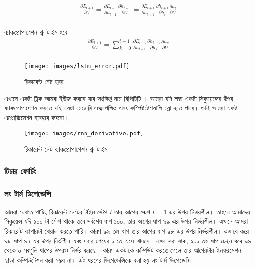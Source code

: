 \documentclass{article}[book]
\begin{document}
\begin{align} %
   \frac {\partial E_{t+1}} {\partial U} = \frac {\partial E_{t+1}} { \partial h_{t+1}} \frac {\partial h_{t+1}} { \partial U} = \frac {\partial E_{t+1}} { \partial h_{t+1}} \frac {\partial h_{t+1}} { \partial h_t} \frac {\partial h_t} { \partial U}\\
\end{align} 

ব্যাকপ্রোপাগেশন থ্রু টাইম হবে - 
\begin{align} %
   \frac {\partial E_{t+1}} {\partial U} = \sum _{k=0} ^{t+1} \frac {\partial E_{t+1}} { \partial h_{t+1}} \frac {\partial h_{t+1}} { \partial h_k} \frac {\partial h_k} { \partial U} \\
\end{align}



\begin{figure}[htbp] %
   \centering
   \texttt{[image: images/lstm\_error.pdf]} 
   \caption{রিকারেন্ট নেট ইরর}
   \label{fig:rnn_error}
\end{figure} 


এখানে একটা ট্রিক আমরা ইউজ করবো যার সংক্ষিপ্ত নাম বিপিটিটি \cite{58337}। আমরা যদি লম্বা একটা সিকুয়েন্সের উপর ব্যাকপোপাগেশন করতে যাই সেটা মেমোরি এক্সপেন্সিভ এবং কম্পিউটেশনালি স্লো হতে পারে।
তাই আমরা একটা এপ্রোক্সিমেশন ব্যবহার করবো। 


\begin{figure}[htbp] %
   \centering
   \texttt{[image: images/rnn\_derivative.pdf]} 
   \caption{রিকারেন্ট নেট ব্যাকপ্রোপাগেশন থ্রু টাইম}
   \label{fig:rnn_derivative}
\end{figure} 

\subsubsection{টিচার ফোর্চিং}
\subsubsection{লং টার্ম ডিপেন্ডেন্সি}
আমরা দেখতে পাচ্ছি রিকারেন্ট নেটের টাইম স্টেপ $t$ তার আগের স্টেপ $t-1$ এর উপর নির্ভরশীল। তাহলে আমাদের সিকুয়েন্স যদি ১০০ টা স্টেপ থাকে তবে সর্বশেষ ধাপ ১০০, তার আগের ধাপ 
৯৯ এর উপর নির্ভরশীল। এখানে আমরা রিকারেন্ট ব্যাপারটা খেয়াল করতে পারি। কারণ ৯৯ তম ধাপ তার আগের ধাপ ৯৮ এর উপর নির্ভরশীল। এভাবে করে ৯৮ ধাপ ৯৭ এর উপর নির্ভশীল এবং 
সবার শেষের ০ তে এসে থামবে। লক্ষ্য করা যাক, ১০০ তম ধাপ চেইন ধরে ৯৯ থেকে ০ সবগুলি ধাপের উপরও নির্ভর করছে। কারণ একটাকে কম্পিউট করতে গেলে তার আগেরটার ইনফরমেশন ছাড়া 
কম্পিউটেশন করা সম্ভব না। এই ধরণের ডিপেন্ডেন্সিকে বলা হয় লং টার্ম ডিপেন্ডেন্সি। 
\end{document}
